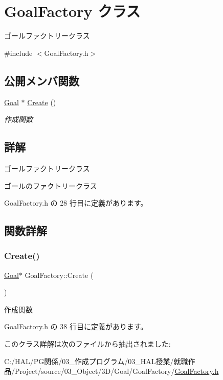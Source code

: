 \hypertarget{class_goal_factory}{}\section{Goal\+Factory クラス}
\label{class_goal_factory}


ゴールファクトリークラス  




{\ttfamily \#include $<$Goal\+Factory.\+h$>$}

\subsection*{公開メンバ関数}
\begin{DoxyCompactItemize}
\item 
\mbox{\hyperlink{class_goal}{Goal}} $\ast$ \mbox{\hyperlink{class_goal_factory_af0b52f5fd6e567a05985285369be7b2e}{Create}} ()
\begin{DoxyCompactList}\small\item\em 作成関数 \end{DoxyCompactList}\end{DoxyCompactItemize}


\subsection{詳解}
ゴールファクトリークラス 

ゴールのファクトリークラス 

 Goal\+Factory.\+h の 28 行目に定義があります。



\subsection{関数詳解}
\mbox{\label{class_goal_factory_af0b52f5fd6e567a05985285369be7b2e}} 
\subsubsection{\texorpdfstring{Create()}{Create()}}
{\footnotesize\ttfamily \mbox{\hyperlink{class_goal}{Goal}}$\ast$ Goal\+Factory\+::\+Create (\begin{DoxyParamCaption}{ }\end{DoxyParamCaption})\hspace{0.3cm}{\ttfamily [inline]}}



作成関数 



 Goal\+Factory.\+h の 38 行目に定義があります。



このクラス詳解は次のファイルから抽出されました\+:\begin{DoxyCompactItemize}
\item 
C\+:/\+H\+A\+L/\+P\+G関係/03\+\_\+作成プログラム/03\+\_\+\+H\+A\+L授業/就職作品/\+Project/source/03\+\_\+\+Object/3\+D/\+Goal/\+Goal\+Factory/\mbox{\hyperlink{_goal_factory_8h}{Goal\+Factory.\+h}}\end{DoxyCompactItemize}
